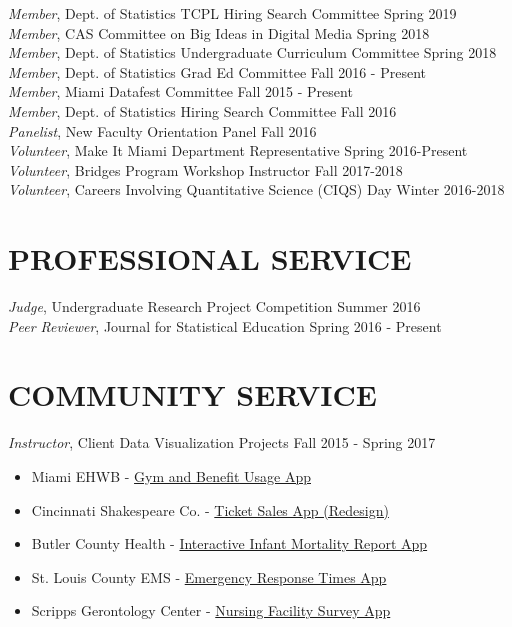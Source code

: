 \documentclass[margin, 10pt]{res}\usepackage[]{graphicx}\usepackage[]{color}
\begin{document}
\begin{resume}
{\it Member}, Dept. of Statistics TCPL Hiring Search Committee \hfill Spring 2019  \\
{\it Member}, CAS Committee on Big Ideas in Digital Media \hfill  Spring 2018 \\
{\it Member}, Dept. of Statistics Undergraduate Curriculum Committee \hfill  Spring 2018 \\
{\it Member}, Dept. of Statistics Grad Ed Committee \hfill  Fall 2016 - Present  \\
{\it Member}, Miami Datafest Committee \hfill  Fall 2015 - Present \\
{\it Member}, Dept. of Statistics Hiring Search Committee \hfill  Fall 2016  \\
{\it Panelist}, New Faculty Orientation Panel \hfill  Fall 2016 \\
{\it Volunteer}, Make It Miami Department Representative  \hfill  Spring 2016-Present  \\
{\it Volunteer}, Bridges Program Workshop Instructor  \hfill  Fall 2017-2018  \\
{\it Volunteer}, Careers Involving Quantitative Science (CIQS) Day  \hfill  Winter 2016-2018  

\section{PROFESSIONAL SERVICE} 
{\it Judge}, Undergraduate Research Project Competition \hfill  Summer 2016 \\
{\it Peer Reviewer}, Journal for Statistical Education \hfill  Spring 2016 - Present  \\

\section{COMMUNITY SERVICE} 
{\it Instructor}, Client Data Visualization Projects \hfill  Fall 2015 - Spring 2017 
\begin{itemize} \itemsep -2pt
\item Miami EHWB - \href{http://dataviz.miamioh.edu/DataVizClassFall2015/MiamiEmployeeHealthApps/EmployeeGymUsage/}{Gym and Benefit Usage App}
\item Cincinnati Shakespeare Co. - \href{http://dataviz.miamioh.edu/Shakespeare/}{Ticket Sales App (Redesign)}
\item Butler County Health - \href{http://dataviz.miamioh.edu/BCH/Butler_County_Infant_Mortality/}{Interactive Infant Mortality Report App}
\item St. Louis County EMS - \href{http://dataviz.miamioh.edu/Minnesota_EMS/}{Emergency Response Times App}
\item Scripps Gerontology Center - \href{http://dataviz.miamioh.edu/DataVizClassFall2015/OhioNursingSurveyApps/EmployeeSafety/}{Nursing Facility Survey App}
\end{itemize}


\end{resume}
\end{document}
